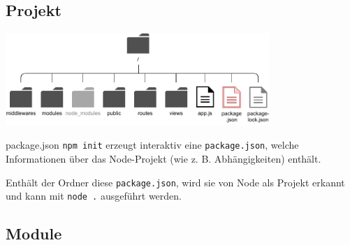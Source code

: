 \subsection{Projekt}

\begin{center}
    \includegraphics[width=0.75\textwidth]{includes/figures/bonus_nodejs_package.pdf}
\end{center}

\begin{defi}{package.json}
    \texttt{npm init} erzeugt interaktiv eine \texttt{package.json}, welche Informationen über das Node-Projekt (wie z. B. Abhängigkeiten) enthält.

    Enthält der Ordner diese \texttt{package.json}, wird sie von Node als Projekt erkannt und kann mit \texttt{node .} ausgeführt werden.
\end{defi}

\subsection{Module}

